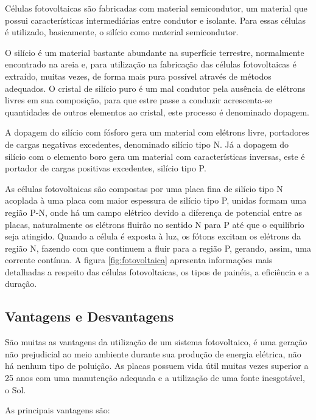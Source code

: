 Células fotovoltaicas são fabricadas com material semicondutor, um material que possui características intermediárias entre condutor e isolante. Para essas células é utilizado, basicamente, o silício como material semicondutor. 
	
O silício é um material bastante abundante na superfície terrestre, normalmente encontrado na areia e, para utilização na fabricação das células fotovoltaicas é extraído, muitas vezes, de forma mais pura possível através de métodos adequados. O cristal de silício puro é um mal condutor pela ausência de elétrons livres em sua composição, para que estre passe a conduzir acrescenta-se quantidades de outros elementos ao cristal, este processo é denominado dopagem.

A dopagem do silício com fósforo gera um material com elétrons livre, portadores de cargas negativas excedentes, denominado silício tipo N. Já a dopagem do silício com o elemento boro gera um material com características inversas, este é portador de cargas positivas excedentes, silício tipo P.

As células fotovoltaicas são compostas por uma placa fina de silício tipo N acoplada à uma placa com maior espessura de silício tipo P, unidas formam uma região P-N, onde há um campo elétrico devido a diferença de potencial entre as placas, naturalmente os elétrons fluirão no sentido N para P até que o equilíbrio seja atingido. Quando a célula é exposta à luz, os fótons excitam os elétrons da região N, fazendo com que continuem a fluir para a região P, gerando, assim, uma corrente contínua. A figura \ref{fig:fotovoltaica} apresenta informações mais detalhadas a respeito das células fotovoltaicas, os tipos de painéis, a eficiência e a duração. 

\subsection{Vantagens e Desvantagens}

São muitas as vantagens da utilização de um sistema fotovoltaico, é uma geração não prejudicial ao meio ambiente durante sua produção de energia elétrica, não há nenhum tipo de poluição. As placas possuem vida útil muitas vezes superior a 25 anos com uma manutenção adequada e a utilização de uma fonte inesgotável, o Sol.

As principais vantagens são:

